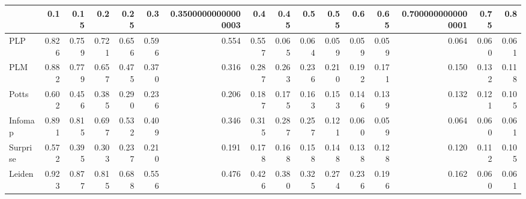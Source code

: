 \begin{tabular}{lrrrrrrrrrrrrrrr}
\toprule
{} &   0.1 &  0.15 &   0.2 &  0.25 &   0.3 & 0.35000000000000003 &   0.4 &  0.45 &   0.5 &  0.55 &   0.6 &  0.65 & 0.7000000000000001 &  0.75 &   0.8 \\
\midrule
PLP      & 0.826 & 0.759 & 0.721 & 0.656 & 0.596 &               0.554 & 0.557 & 0.065 & 0.064 & 0.059 & 0.059 & 0.059 &              0.064 & 0.060 & 0.061 \\
PLM      & 0.882 & 0.779 & 0.657 & 0.475 & 0.370 &               0.316 & 0.287 & 0.263 & 0.236 & 0.210 & 0.192 & 0.171 &              0.150 & 0.132 & 0.118 \\
Potts    & 0.602 & 0.456 & 0.385 & 0.290 & 0.236 &               0.206 & 0.187 & 0.175 & 0.163 & 0.153 & 0.146 & 0.139 &              0.132 & 0.121 & 0.105 \\
Infomap  & 0.891 & 0.815 & 0.697 & 0.532 & 0.409 &               0.346 & 0.315 & 0.287 & 0.257 & 0.121 & 0.060 & 0.059 &              0.064 & 0.060 & 0.061 \\
Surprise & 0.572 & 0.395 & 0.303 & 0.237 & 0.210 &               0.191 & 0.178 & 0.168 & 0.158 & 0.148 & 0.138 & 0.128 &              0.120 & 0.112 & 0.105 \\
Leiden   & 0.923 & 0.877 & 0.815 & 0.688 & 0.556 &               0.476 & 0.426 & 0.380 & 0.325 & 0.274 & 0.236 & 0.196 &              0.162 & 0.060 & 0.061 \\
\bottomrule
\end{tabular}
